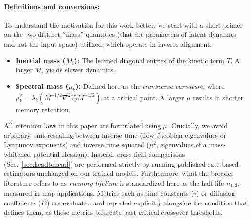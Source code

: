 \documentclass{article}
\begin{document}
\paragraph{Definitions and conversions:} To understand the motivation for this work better, we start with a short primer on the two distinct ``mass'' quantities (that are parameters of latent dynamics and not the input space) utilized, which operate in inverse alignment.
\begin{itemize}
    \item \textbf{Inertial mass ($M_i$):} The learned diagonal entries of the kinetic term $T$. A larger $M_i$ yields slower dynamics.
    \item \textbf{Spectral mass ($\mu_k$):} Defined here as the \emph{transverse curvature}, where $\mu_k^2=\lambda_k(M^{-1/2}\nabla^2V_\theta M^{-1/2})$ at a critical point. A larger $\mu$ results in shorter memory retention.
\end{itemize}
All retention laws in this paper are formulated using $\mu$. Crucially, we avoid arbitrary unit rescaling between inverse time (flow-Jacobian eigenvalues or Lyapunov exponents) and inverse time squared ($\mu^2$, eigenvalues of a mass-whitened potential Hessian). Instead, cross-field comparisons (Sec.~\ref{sec:headtohead}) are performed strictly by running published rate-based estimators unchanged on our trained models. Furthermore, what the broader literature refers to as \emph{memory lifetime} is standardized here as the half-life $n_{1/2}$, measured in map applications. Metrics such as time constants ($\tau$) or diffusion coefficients ($D$) are evaluated and reported explicitly alongside the condition that defines them, as these metrics bifurcate past critical crossover thresholds.
\end{document}
